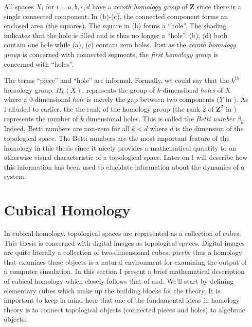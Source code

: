 All spaces $X_i$ for $i = a,b,c,d$ have a \textit{zeroth homology group} of $\mathbf{Z}$ since there is a single connected component. In (b)-(c), the connected component forms an enclosed area (\eg the squares). The square in (b) forms a ``hole''. The shading indicates that the hole is filled and is thus no longer a ``hole''. (b), (d) both contain one hole while (a), (c) contain zero holes. Just as the \textit{zeroth homology group} is concerned with connected segments, the \textit{first homology group} is concerned with ``holes''.

The terms ``piece'' and ``hole'' are informal. Formally, we could say that the $k^{th}$ homology group, $H_k(X)$, represents the group of $k$-dimensional \textit{holes} of $X$ where a 0-dimensional \textit{hole} is merely the gap between two components (\eg $Y$ in ). As I alluded to earlier, the the rank of the homology group (\eg the rank $2$ of $\mathbf{Z}^2$ in ) represents the number of $k$ dimensional holes. This is called the \textit{Betti number} $\beta_k$. Indeed, Betti numbers are non-zero for all $k < d$ where $d$ is the dimension of the topological space. The Betti numbers are the most important feature of the homology in this thesis since it nicely provides a mathematical quantity to an otherwise visual characteristic of a topological space. Later on I will describe how this information has been used to elucidate information about the dynamics of a system.

\section{Cubical Homology} \label{ch2:cubicalhomology}

In cubical homology, topological spaces are represented as a collection of cubes. This thesis is concerned with digital images as topological spaces. Digital images are quite literally a collection of two-dimensional cubes, \textit{pixels}, thus a homology that examines these objects is a natural environment for examining the output of a computer simulation. In this section I present a brief mathematical description of cubical homology which closely follows that of and. We'll start by defining elementary cubes which make up the building blocks for the theory. It is important to keep in mind here that one of the fundamental ideas in homology theory is to connect topological objects (\eg connected pieces and holes) to algebraic objects.

